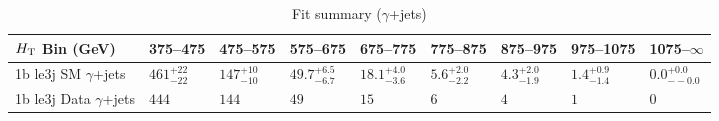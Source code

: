 \documentclass[8pt]{article}
\def\scalht{\mbox{$H_{\rm{T}}$}\xspace}
\newcommand\T{\rule{0pt}{2.6ex}}
\begin{document}
\begin{table}[ht!]
\caption{Fit summary ($\gamma$+jets)}
\label{tab:ensemble-summary}
\centering
\begin{tabular}{ lllllllll }

\hline
\scalht Bin (GeV)       & 375--475                       & 475--575                       & 575--675                       & 675--775                       & 775--875                       & 875--975                       & 975--1075                      & 1075--$\infty$                 \\ [1.000000ex]
\hline
1b le3j SM $\gamma$+jets\T & $461^{+22}_{-22}$              & $147^{+10}_{-10}$              & $49.7^{+6.5}_{-6.7}$           & $18.1^{+4.0}_{-3.6}$           & $5.6^{+2.0}_{-2.2}$            & $4.3^{+2.0}_{-1.9}$            & $1.4^{+0.9}_{-1.4}$            & $0.0^{+0.0}_{--0.0}$           \\ 
1b le3j Data $\gamma$+jets\T & $444$                          & $144$                          & $49$                           & $15$                           & $6$                            & $4$                            & $1$                            & $0$                            \\ 
\hline

\end{tabular}
\end{table}
\end{document}
